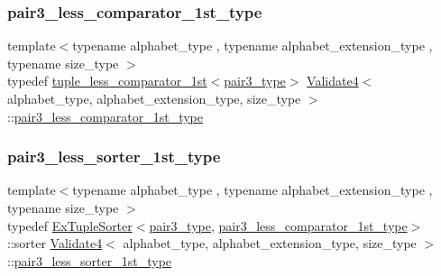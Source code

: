 \subsubsection{\texorpdfstring{pair3\+\_\+less\+\_\+comparator\+\_\+1st\+\_\+type}{pair3\_less\_comparator\_1st\_type}}
{\footnotesize\ttfamily template$<$typename alphabet\+\_\+type , typename alphabet\+\_\+extension\+\_\+type , typename size\+\_\+type $>$ \\
typedef \hyperlink{structtuple__less__comparator__1st}{tuple\+\_\+less\+\_\+comparator\+\_\+1st}$<$\hyperlink{class_validate4_ac023757abc671597cf81dcc2d70b1ab1}{pair3\+\_\+type}$>$ \hyperlink{class_validate4}{Validate4}$<$ alphabet\+\_\+type, alphabet\+\_\+extension\+\_\+type, size\+\_\+type $>$\+::\hyperlink{class_validate4_a12c8c95c3ef8bf9f3521b439454c5aa0}{pair3\+\_\+less\+\_\+comparator\+\_\+1st\+\_\+type}\hspace{0.3cm}{\ttfamily [private]}}

\mbox{\label{class_validate4_aff3135d55f749682df7e0f97c82a6769}} 
\subsubsection{\texorpdfstring{pair3\+\_\+less\+\_\+sorter\+\_\+1st\+\_\+type}{pair3\_less\_sorter\_1st\_type}}
{\footnotesize\ttfamily template$<$typename alphabet\+\_\+type , typename alphabet\+\_\+extension\+\_\+type , typename size\+\_\+type $>$ \\
typedef \hyperlink{struct_ex_tuple_sorter}{Ex\+Tuple\+Sorter}$<$\hyperlink{class_validate4_ac023757abc671597cf81dcc2d70b1ab1}{pair3\+\_\+type}, \hyperlink{class_validate4_a12c8c95c3ef8bf9f3521b439454c5aa0}{pair3\+\_\+less\+\_\+comparator\+\_\+1st\+\_\+type}$>$\+::sorter \hyperlink{class_validate4}{Validate4}$<$ alphabet\+\_\+type, alphabet\+\_\+extension\+\_\+type, size\+\_\+type $>$\+::\hyperlink{class_validate4_aff3135d55f749682df7e0f97c82a6769}{pair3\+\_\+less\+\_\+sorter\+\_\+1st\+\_\+type}\hspace{0.3cm}{\ttfamily [private]}}

\mbox{\label{class_validate4_ac023757abc671597cf81dcc2d70b1ab1}} 
